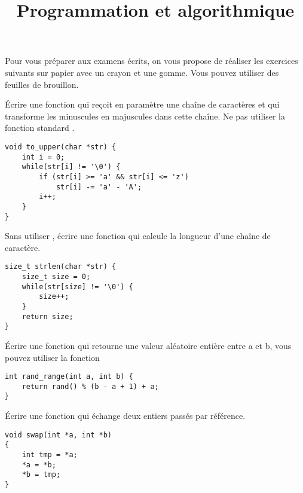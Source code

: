 \documentclass[french,a4paper,addpoints,11pt]{exam}
\title{Programmation et algorithmique}
\begin{document}
\maketitle
\thispagestyle{headandfoot}

Pour vous préparer aux examens écrits, on vous propose de réaliser les exercices suivants sur papier avec un crayon et une gomme. Vous pouvez utiliser des feuilles de brouillon.

\begin{questions}

\question Écrire une fonction qui reçoit en paramètre une chaîne de caractères et qui transforme les minuscules en majuscules dans cette chaîne. Ne pas utiliser la fonction standard .

\begin{solutionordottedlines}[6cm]
\begin{lstlisting}
void to_upper(char *str) {
    int i = 0;
    while(str[i] != '\0') {
        if (str[i] >= 'a' && str[i] <= 'z')
            str[i] -= 'a' - 'A';
        i++;
    }
}
\end{lstlisting}
\end{solutionordottedlines}

\question Sans utiliser , écrire une fonction qui calcule la longueur d'une chaîne de caractère.

\begin{solutionordottedlines}[5cm]
\begin{lstlisting}
size_t strlen(char *str) {
    size_t size = 0;
    while(str[size] != '\0') {
        size++;
    }
    return size;
}
\end{lstlisting}
\end{solutionordottedlines}

\question Écrire une fonction qui retourne une valeur aléatoire entière entre a et b, vous pouvez utiliser la fonction 

\begin{solutionordottedlines}[3cm]
\begin{lstlisting}
int rand_range(int a, int b) {
    return rand() % (b - a + 1) + a;
}
\end{lstlisting}
\end{solutionordottedlines}

\question Écrire une fonction qui échange deux entiers passés par référence.

\begin{solutionordottedlines}[7cm]
\begin{lstlisting}
void swap(int *a, int *b)
{
    int tmp = *a;
    *a = *b;
    *b = tmp;
}
\end{lstlisting}
\end{solutionordottedlines}


\end{questions}
\end{document}
